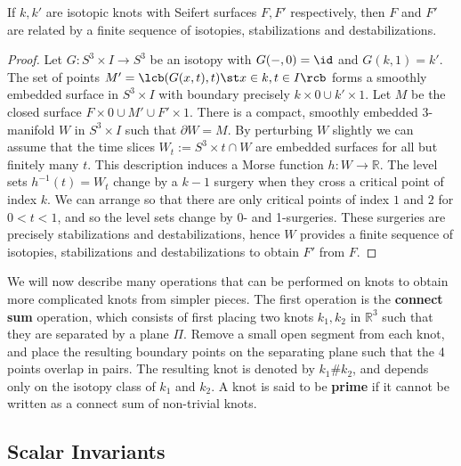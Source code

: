 \begin{prop}
\label{Seifert surface moves}
If $k,k'$ are isotopic knots with Seifert surfaces $F,F'$ respectively, then $F$ and $F'$ are related by a finite sequence of isotopies, stabilizations and destabilizations.
\end{prop}
\begin{proof}
Let $G : S^3 \times I \rightarrow S^3$ be an isotopy with $G(-,0)=\id$ and $G(k,1)=k'$. The set of points $M' = \lcb (G(x,t),t) \st x \in k,t\in I \rcb$ forms a smoothly embedded surface in $S^3 \times I$ with boundary precisely $k \times 0 \cup k' \times 1$. Let $M$ be the closed surface $F \times 0 \cup M' \cup F' \times 1$. There is a compact, smoothly embedded 3-manifold $W$ in $S^3 \times I$ such that $\partial W = M$. By perturbing $W$ slightly we can assume that the time slices $W_t := S^3 \times t \cap W$ are embedded surfaces for all but finitely many $t$. This description induces a Morse function $h : W \rightarrow \mathbb R$. The level sets $h^{-1}(t) = W_t$ change by a $k-1$ surgery when they cross a critical point of index $k$. We can arrange so that there are only critical points of index $1$ and $2$ for $0 < t < 1$, and so the level sets change by 0- and 1-surgeries. These surgeries are precisely stabilizations and destabilizations, hence $W$ provides a finite sequence of isotopies, stabilizations and destabilizations to obtain $F'$ from $F$.
\end{proof}

We will now describe many operations that can be performed on knots to obtain more complicated knots from simpler pieces. The first operation is the \textbf{connect sum} operation, which consists of first placing two knots $k_1,k_2$ in $\mathbb R^3$ such that they are separated by a plane $\Pi$. Remove a small open segment from each knot, and place the resulting boundary points on the separating plane such that the 4 points overlap in pairs. The resulting knot is denoted by $k_1 \# k_2$, and depends only on the isotopy class of $k_1$ and $k_2$. A knot is said to be \textbf{prime} if it cannot be written as a connect sum of non-trivial knots.









\subsection{Scalar Invariants}
\label{Scalar Invariants}


